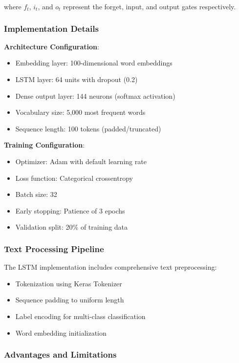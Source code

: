 \documentclass[11pt,a4paper]{article}
\begin{document}
where $f_t$, $i_t$, and $o_t$ represent the forget, input, and output gates respectively.

\subsubsection{Implementation Details}

\textbf{Architecture Configuration}:
\begin{itemize}
    \item Embedding layer: 100-dimensional word embeddings
    \item LSTM layer: 64 units with dropout (0.2)
    \item Dense output layer: 144 neurons (softmax activation)
    \item Vocabulary size: 5,000 most frequent words
    \item Sequence length: 100 tokens (padded/truncated)
\end{itemize}

\textbf{Training Configuration}:
\begin{itemize}
    \item Optimizer: Adam with default learning rate
    \item Loss function: Categorical crossentropy
    \item Batch size: 32
    \item Early stopping: Patience of 3 epochs
    \item Validation split: 20\% of training data
\end{itemize}

\subsubsection{Text Processing Pipeline}

The LSTM implementation includes comprehensive text preprocessing:
\begin{itemize}
    \item Tokenization using Keras Tokenizer
    \item Sequence padding to uniform length
    \item Label encoding for multi-class classification
    \item Word embedding initialization
\end{itemize}

\subsubsection{Advantages and Limitations}
\end{document}
